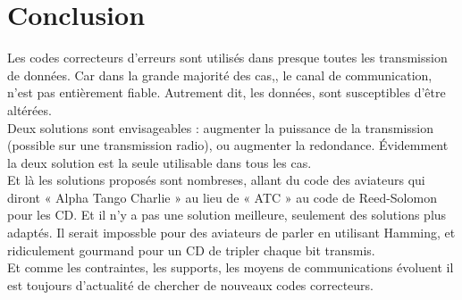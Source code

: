 \documentclass[12pt]{article}
\begin{document}
\section{Conclusion}
\label{sec:conclu}
Les codes correcteurs d'erreurs sont utilisés dans presque toutes les transmission de données. Car dans la grande majorité des cas,, le canal de communication, n'est pas entièrement fiable. Autrement dit, les données, sont susceptibles d'être altérées.\\
Deux solutions sont envisageables : augmenter la puissance de la transmission (possible sur une transmission radio), ou augmenter la redondance. Évidemment la deux solution est la seule utilisable dans tous les cas.\\
Et là les solutions proposés sont nombreses, allant du code des aviateurs qui diront « Alpha Tango Charlie » au lieu de « ATC » au code de Reed-Solomon pour les CD. Et il n’y a pas une solution meilleure, seulement des solutions plus adaptés. Il serait impossble pour des aviateurs de parler en utilisant Hamming, et ridiculement gourmand pour un CD de tripler chaque bit transmis.\\
Et comme les contraintes, les supports, les moyens de communications évoluent il est toujours d’actualité de chercher de nouveaux codes correcteurs.\\
\end{document}
